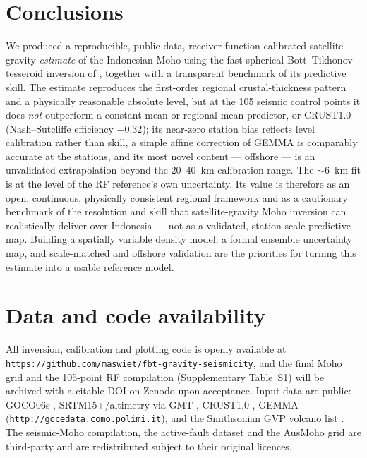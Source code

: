 \documentclass[extra,mreferee]{gji}
\begin{document}
\section{Conclusions}
We produced a reproducible, public-data, receiver-function-calibrated
satellite-gravity \emph{estimate} of the Indonesian Moho using the fast spherical
Bott--Tikhonov tesseroid inversion of \citet{uieda2017}, together with a transparent
benchmark of its predictive skill. The estimate reproduces the first-order regional
crustal-thickness pattern and a physically reasonable absolute level, but at the 105
seismic control points it does \emph{not} outperform a constant-mean or regional-mean
predictor, or {CRUST1.0} (Nash--Sutcliffe efficiency $-0.32$); its near-zero station
bias reflects level calibration rather than skill, a simple affine correction of
{GEMMA} is comparably accurate at the stations, and its most novel content ---
offshore --- is an unvalidated extrapolation beyond the $20$--$40$~km calibration
range. The $\sim$6~km fit is at the level of the RF reference's own uncertainty. Its
value is therefore as an open, continuous, physically consistent regional framework
and as a cautionary benchmark of the resolution and skill that satellite-gravity Moho
inversion can realistically deliver over Indonesia --- not as a validated,
station-scale predictive map. Building a spatially variable density model, a formal
ensemble uncertainty map, and scale-matched and offshore validation are the priorities
for turning this estimate into a usable reference model.

\section*{Data and code availability}
All inversion, calibration and plotting code is openly available at
\texttt{https://github.com/maswiet/fbt-gravity-seismicity}, and the final Moho grid
and the 105-point RF compilation (Supplementary Table~S1) will be archived with a
citable DOI on Zenodo upon acceptance. Input data are public:
{GOCO06s} \citep{kvas2021}, {SRTM15+}/altimetry via GMT
\citep{tozer2019,sandwell2014}, {CRUST1.0} \citep{laske2013}, {GEMMA}
\citep{reguzzoni2015} (\texttt{http://gocedata.como.polimi.it}), and the
Smithsonian {GVP} volcano list \citep{gvp2013}. The seismic-Moho compilation, the
active-fault dataset and the {AusMoho} grid \citep{kennett2011} are third-party and
are redistributed subject to their original licences.
\end{document}
